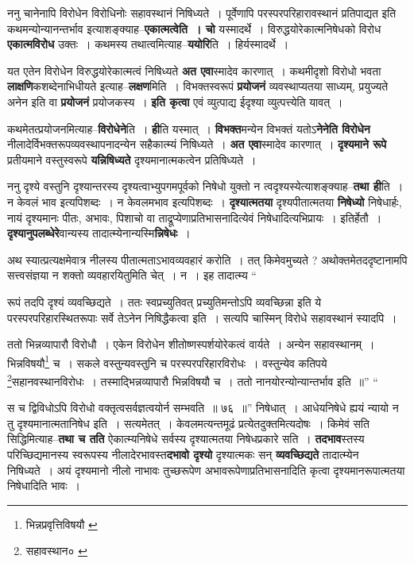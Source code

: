 \documentclass[article,12pt,a4paper]{memoir}
\begin{document}
	  \pstart ननु चानेनापि विरोधेन विरोधिनोः सहावस्थानं निषिध्यते । पूर्वेणापि परस्परपरिहारावस्थानं प्रतिपाद्यत इति कथमन्योन्यानन्तर्भाव इत्याशङ्क्याह--\textbf{एकात्मत्वेति । चो} यस्मादर्थे । विरुद्धयोरेकात्मनिषेधको विरोध \textbf{एकात्मविरोध} उक्तः । कथमस्य तथात्वमित्याह--\textbf{ययोरि}ति । हिर्यस्मादर्थे ।
	\pend
      

	  \pstart यत एतेन विरोधेन विरुद्धयोरेकात्मत्वं निषिध्यते \textbf{अत एवा}स्मादेव कारणात् । कथमीदृशो विरोधो भवता \textbf{लाक्षणि}कशब्देनाभिधीयते इत्याह--\textbf{लक्षण}मिति । विभक्तस्वरूपं \textbf{प्रयोजनं} व्यवस्थाप्यतया साध्यम्, प्रयुज्यते अनेन इति वा \textbf{प्रयोजनं} प्रयोजकस्य । \textbf{इति कृत्वा} एवं व्युत्पाद्य ईदृश्या व्युत्पत्त्येति यावत् ।
	\pend
      

	  \pstart कथमेतत्प्रयोजनमित्याह--\textbf{विरोधेने}ति । \textbf{ही}ति यस्मात् । \textbf{विभक्त}मन्येन विभक्तं यतोऽ\textbf{नेनेति विरोधेन} नीलादेर्विभक्तरूपव्यवस्थापनादन्येन सहैकात्म्यं निषिध्यते । \textbf{अत एवा}स्मादेव कारणात् । \textbf{दृश्यमाने रूपे} प्रतीयमाने वस्तुस्वरूपे \textbf{यन्निषिध्यते} दृश्यमानात्मकत्वेन प्रतिषिध्यते ।
	\pend
      

	  \pstart ननु दृश्ये वस्तुनि दृश्यान्तरस्य दृश्यत्वाभ्युपगमपूर्वको निषेधो युक्तो न त्वदृश्यस्येत्याशङ्क्याह--\textbf{तथा ही}ति । न केवलं भाव इत्यपिशब्दः । न केवलमभाव इत्यपिशब्दः । \textbf{दृश्यात्मतया} दृश्यपीतात्मतया \textbf{निषेध्यो} निषेधार्हः, नायं दृश्यमानः पीतः, अभावः, पिशाचो वा ताद्रूप्येणाप्रतिभासनादित्येवं निषेधादित्यभिप्रायः । इतिर्हेतौ । \textbf{दृश्यानुपलब्धेरे}वान्यस्य तादात्म्येनान्यस्मि\textbf{न्निषेधः} ।
	\pend
      

	  \pstart अथ स्यात्प्रत्यक्षमेवात्र नीलस्य पीतात्मताऽभावव्यवहारं करोति । तत् किमेवमुच्यते ? अथोक्तमेतददृष्टानामपि सत्त्वसंज्ञया न शक्तो व्यवहारयितुमिति चेत् । न । इह तादात्म्य \leavevmode{} “
	  
	रूपं तदपि दृश्यं व्यवच्छिद्यते । ततः स्वप्रच्युतिवत् प्रच्युतिमन्तोऽपि व्यवच्छिन्ना इति ये परस्परपरिहारस्थितरूपाः सर्वे तेऽनेन निषिद्धैकत्वा इति । सत्यपि चास्मिन् विरोधे सहावस्थानं स्यादपि । 
	  
	ततो भिन्नव्यापारौ विरोधौ । एकेन विरोधेन शीतोष्णस्पर्शयोरेकत्वं वार्यते । अन्येन सहावस्थानम् । भिन्नविषयौ\footnote{भिन्नप्रवृत्तिविषयौ \cite{dp-msA} \cite{dp-edP} \cite{dp-edH} \cite{dp-edN}} च । सकले वस्तुन्यवस्तुनि च परस्परपरिहारविरोधः । वस्तुन्येव कतिपये \footnote{सहावस्थान० \cite{dp-msB} \cite{dp-msC}}\-सहानवस्थानविरोधः । तस्माद्भिन्नव्यापारौ भिन्नविषयौ च । ततो नानयोरन्योन्यान्तर्भाव इति ॥” “
	  
	स च द्विविधोऽपि विरोधो वक्तृत्वसर्वज्ञत्वयोर्न सम्भवति ॥ ७६ ॥” निषेधात् । आधेयनिषेधे ह्ययं न्यायो न तु दृश्यमानात्मतानिषेध इति । सत्यमेतत् । केवलमत्यन्तमूढं प्रत्येतदुक्तमित्यदोषः । किमेवं सति सिद्धिमित्याह--\textbf{तथा च तति} ऐकात्म्यनिषेधे सर्वस्य दृश्यात्मतया निषेधप्रकारे सति । \textbf{तदभाव}स्तस्य परिच्छिद्यमानस्य स्वरूपस्य नीलादेरभावस्त\textbf{दभावो दृश्यो} दृश्यात्म\leavevmode{}कः सन् \textbf{व्यवच्छिद्यते} तादात्म्येन निषिध्यते । अयं दृश्यमानो नीलो नाभावः तुच्छरूपेण अभावरूपेणाप्रतिभासनादिति कृत्वा दृश्यमानरूपात्मतया निषेधादिति भावः ।
	\pend
      
\end{document}
